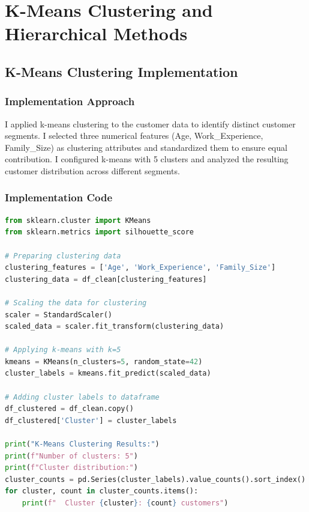 \documentclass[12pt,a4paper]{article}
\begin{document}
\section{K-Means Clustering and Hierarchical Methods}

\subsection{K-Means Clustering Implementation}

\subsubsection{Implementation Approach}
I applied k-means clustering to the customer data to identify distinct customer segments. I selected three numerical features (Age, Work\_Experience, Family\_Size) as clustering attributes and standardized them to ensure equal contribution. I configured k-means with 5 clusters and analyzed the resulting customer distribution across different segments.

\subsubsection{Implementation Code}
\begin{lstlisting}[language=Python, caption=K-Means Clustering Implementation]
from sklearn.cluster import KMeans
from sklearn.metrics import silhouette_score

# Preparing clustering data
clustering_features = ['Age', 'Work_Experience', 'Family_Size']
clustering_data = df_clean[clustering_features]

# Scaling the data for clustering
scaler = StandardScaler()
scaled_data = scaler.fit_transform(clustering_data)

# Applying k-means with k=5
kmeans = KMeans(n_clusters=5, random_state=42)
cluster_labels = kmeans.fit_predict(scaled_data)

# Adding cluster labels to dataframe
df_clustered = df_clean.copy()
df_clustered['Cluster'] = cluster_labels

print("K-Means Clustering Results:")
print(f"Number of clusters: 5")
print(f"Cluster distribution:")
cluster_counts = pd.Series(cluster_labels).value_counts().sort_index()
for cluster, count in cluster_counts.items():
    print(f"  Cluster {cluster}: {count} customers")
\end{lstlisting}
\end{document}
